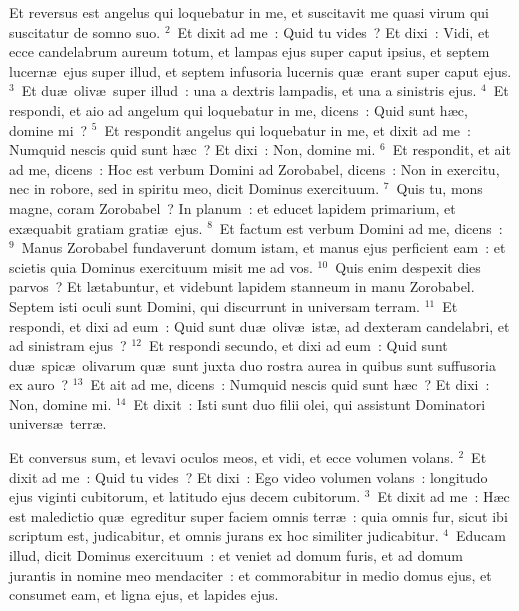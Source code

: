 \bchapter
\lettrine[lines=3,image=true,loversize=0.05,lraise=-0.03]{E}{}t reversus est angelus qui loquebatur in me, et suscitavit me quasi virum qui suscitatur de somno suo.
${}^{2}$~Et dixit ad me~: Quid tu vides~? Et dixi~: Vidi, et ecce candelabrum aureum totum, et lampas ejus super caput ipsius, et septem lucern\ae\ ejus super illud, et septem infusoria lucernis qu\ae\ erant super caput ejus.
${}^{3}$~Et du\ae\ oliv\ae\ super illud~: una a dextris lampadis, et una a sinistris ejus.
${}^{4}$~Et respondi, et aio ad angelum qui loquebatur in me, dicens~: Quid sunt h\ae c, domine mi~?
${}^{5}$~Et respondit angelus qui loquebatur in me, et dixit ad me~: Numquid nescis quid sunt h\ae c~? Et dixi~: Non, domine mi.
${}^{6}$~Et respondit, et ait ad me, dicens~: Hoc est verbum Domini ad Zorobabel, dicens~: Non in exercitu, nec in robore, sed in spiritu meo, dicit Dominus exercituum.
${}^{7}$~Quis tu, mons magne, coram Zorobabel~? In planum~: et educet lapidem primarium, et ex\ae quabit gratiam grati\ae\ ejus.
${}^{8}$~Et factum est verbum Domini ad me, dicens~:
${}^{9}$~Manus Zorobabel fundaverunt domum istam, et manus ejus perficient eam~: et scietis quia Dominus exercituum misit me ad vos.
${}^{10}$~Quis enim despexit dies parvos~? Et l\ae tabuntur, et videbunt lapidem stanneum in manu Zorobabel. Septem isti oculi sunt Domini, qui discurrunt in universam terram.
${}^{11}$~Et respondi, et dixi ad eum~: Quid sunt du\ae\ oliv\ae\ ist\ae , ad dexteram candelabri, et ad sinistram ejus~?
${}^{12}$~Et respondi secundo, et dixi ad eum~: Quid sunt du\ae\ spic\ae\ olivarum qu\ae\ sunt juxta duo rostra aurea in quibus sunt suffusoria ex auro~?
${}^{13}$~Et ait ad me, dicens~: Numquid nescis quid sunt h\ae c~? Et dixi~: Non, domine mi.
${}^{14}$~Et dixit~: Isti sunt duo filii olei, qui assistunt Dominatori univers\ae\ terr\ae .

\bchapter
\lettrine[lines=3,image=true,loversize=0.05,lraise=-0.03]{E}{}t conversus sum, et levavi oculos meos, et vidi, et ecce volumen volans.
${}^{2}$~Et dixit ad me~: Quid tu vides~? Et dixi~: Ego video volumen volans~: longitudo ejus viginti cubitorum, et latitudo ejus decem cubitorum.
${}^{3}$~Et dixit ad me~: H\ae c est maledictio qu\ae\ egreditur super faciem omnis terr\ae~: quia omnis fur, sicut ibi scriptum est, judicabitur, et omnis jurans ex hoc similiter judicabitur.
${}^{4}$~Educam illud, dicit Dominus exercituum~: et veniet ad domum furis, et ad domum jurantis in nomine meo mendaciter~: et commorabitur in medio domus ejus, et consumet eam, et ligna ejus, et lapides ejus.


